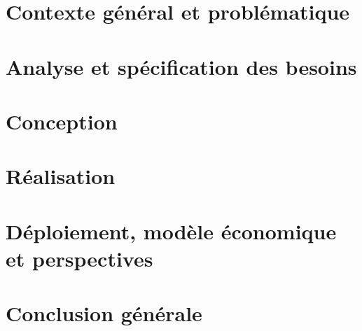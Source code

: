 \documentclass[12pt, a4paper, oneside]{report}
\begin{document}
\chapter{Contexte général et problématique}


\chapter{Analyse et spécification des besoins}


\chapter{Conception}


\chapter{Réalisation}


\chapter{Déploiement, modèle économique et perspectives}


\chapter*{Conclusion générale}

\end{document}
